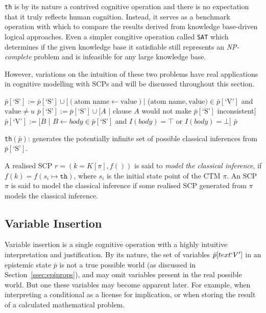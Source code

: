 \texttt{th} is by its nature a contrived cognitive operation and there is no expectation that it truly reflects human cognition. Instead, it serves as a benchmark operation with which to compare the results derived from knowledge base-driven logical approaches. Even a simpler congitive operation called \texttt{SAT} which determines if the given knowledge base it satisfiable still represents an \textit{NP-complete}  problem and is infeasible for any large knowledge base\citep{schaefer1978complexity}.

However, variations on the intuition of these two problems have real applications in cognitive modelling with SCPs and will be discussed throughout this section.

\begin{algorithm}[H] 
\SetAlgoLined
{}
{
$\bar{p}[\textrm{`S'}]:=\bar{p}[\textrm{`S'}] \cup [(\text{atom name} \leftarrow \text{value}) |$ ($\text{atom name},\text{value}) \in \bar{p}[\textrm{`V'}]$ and $\text{value} \neq u$\;
$\bar{p}[\textrm{`S'}]:=\bar{p}[\textrm{`S'}] \cup [A$ | clause $A$ would not make $\bar{p}[\textrm{`S'}]$ inconsistent$]$\;
$\bar{p}[\textrm{`V'}]:=[B$ | $B \leftarrow body \in \bar{p}[\textrm{`S'}]$ and $ I(body)=\top$ or $I(body)=\bot$]\; 
\Return $\bar{p}$
}

\caption{\texttt{th}$(\bar{p})$: generates the potentially infinite set of possible classical inferences from $\bar{p}[\textrm{`S'}]$.}
\label{cogOp:th}
\end{algorithm}

A realised SCP $r=(k=K[\pi],f())$ is said to \textit{model the classical inference}, if $f(k) = f(s_i \longmapsto \texttt{th})$, where $s_i$ is the initial state point of the CTM $\pi$. An SCP $\pi$ is said to model the classical inference if some realised SCP generated from $\pi$ models the classical inference.


\subsection{Variable Insertion}

Variable insertion is a single cognitive operation with a highly intuitive interpretation and justification. By its nature, the set of variables $\bar{p}[text{`V'}]$ in an epistemic state $\bar{p}$ is not a true possible world (as discussed in Section~\ref{ssec:epiprops}), and may omit variables present in the real possible world. But one these variables may become apparent later. For example, when interpreting a conditional as a license for implication, or when storing the result of a calculated mathematical problem.

